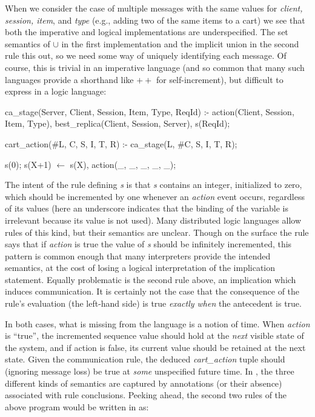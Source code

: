 When we consider the case of multiple messages with the same values for
{\em client, session, item}, and {\em type} (e.g., adding two of the same items to a cart)
we see that both the imperative and logical implementations are underspecified.
The set semantics of $\cup$ in the first implementation and the implicit union 
in the second rule this out, so we need some way of uniquely identifying each message.
Of course, this is trivial in an imperative language (and so common that many such languages
provide a shorthand like $++$ for self-increment), but difficult to express in a logic language:

\begin{Dedalus}
ca_stage(Server, Client, Session, Item, Type, ReqId) :-
  action(Client, Session, Item, Type),
  best_replica(Client, Session, Server),
  s(ReqId);

cart_action(#L, C, S, I, T, R) :-
  ca_stage(L, #C, S, I, T, R);

s(0);
s(X+1) \(\leftarrow\)  s(X), action(_, _, _, _, _);
\end{Dedalus}


The intent of the rule defining {\em s} is that \emph{s} contains an integer, initialized to
zero, which should be incremented by one whenever an {\em action} event occurs,
regardless of its values (here an underscore indicates that the binding of the variable
is irrelevant because its value is not used).  
Many distributed logic languages allow rules of this kind,
but their semantics are unclear.  Though on the surface the rule says that if {\em action} is true
the value of {\em s} should be infinitely incremented, this pattern is common enough
that many interpreters provide the intended semantics, at the cost of losing a logical
interpretation of the implication statement.  Equally problematic is the second rule above,
an implication which induces communication.  It is certainly not the case that the consequence of the rule's evaluation (the left-hand side) is true {\em exactly when} the antecedent is
true.  

In both cases, what is missing from the language is a notion of time.  When {\em action} is ``true'',
the incremented sequence value should
hold at the {\em next} visible state of the system, and if action is false, its current
value should be retained at the next state.  Given the communication rule, 
the deduced {\em cart\_action}
tuple should (ignoring message loss) be true at {\em some} unspecified future time.  In \lang,
the three different kinds of semantics are captured by annotations (or their absence) 
associated with rule conclusions.  Peeking ahead, the second two rules of the above program would be written in \lang as:

